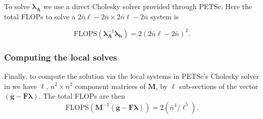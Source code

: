 %
%
%
To solve $\symbf{\lambda}_{\textbf{A}}$ we use a direct Cholesky solver provided through PETSc. 
Here the total FLOPs to solve a $2\bar{n}\ell - 2\bar{n} \times 2\bar{n}\ell - 2\bar{n}$ system is 

\begin{equation}
	\text{FLOPS}(\symbf{\lambda}_{\textbf{A}}^{-1}\symbf{\lambda}_{\textbf{b}}) = 2  (2\bar{n}\ell - 2\bar{n})^2.
\end{equation}

%
%
%
\subsubsection{Computing the local solves}

%
%
%
Finally, to compute the solution via the local systems in PETSc's Cholesky solver in  we have $\ell$, $n^2 \times n^2$ component matrices of $\textbf{M}$, by $\ell$ sub-sections of the vector $(\bar{\textbf{g}} - \textbf{F} \symbf{\lambda})$. 
The total FLOPs are then 
\begin{equation}
	\text{FLOPS}(\textbf{M}^{-1}(\bar{\textbf{g}} - \textbf{F} \symbf{\lambda})) = 2 (\bar{n}^4/\ell^5).
\end{equation}

%






